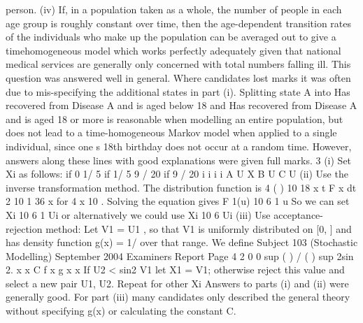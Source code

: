 \documentclass[a4paper,12pt]{article}
\begin{document}
person.
(iv) If, in a population taken as a whole, the number of people in each age group is
roughly constant over time, then the age-dependent transition rates of the
individuals who make up the population can be averaged out to give a timehomogeneous
model which works perfectly adequately given that national
medical services are generally only concerned with total numbers falling ill.
This question was answered well in general. Where candidates lost marks it
was often due to mis-specifying the additional states in part (i). Splitting state
A into Has recovered from Disease A and is aged below 18 and Has
recovered from Disease A and is aged 18 or more is reasonable when
modelling an entire population, but does not lead to a time-homogeneous
Markov model when applied to a single individual, since one s 18th birthday
does not occur at a random time. However, answers along these lines with
good explanations were given full marks.
3 (i) Set Xi as follows:
if 0 1/ 5
if 1/ 5 9 / 20
if 9 / 20
i
i i
i
A U
X B U
C U
(ii) Use the inverse transformation method.
The distribution function is
4
( ) 10
18
x t F x dt
2 10
1
36
x
for 4 x 10 .
Solving the equation gives F 1(u) 10 6 1 u
So we can set Xi 10 6 1 Ui
or alternatively we could use Xi 10 6 Ui
(iii) Use acceptance-rejection method:
Let V1 = U1 , so that V1 is uniformly distributed on [0, ] and has density
function g(x) = 1/ over that range.
We define
Subject 103 (Stochastic Modelling) September 2004 Examiners Report
Page 4
2
0 0
sup ( ) / ( ) sup 2sin 2.
x x
C f x g x x
If U2 < sin2 V1 let X1 = V1; otherwise reject this value and select a new pair
U1, U2. Repeat for other Xi
Answers to parts (i) and (ii) were generally good. For part (iii) many candidates only described the general theory without specifying g(x) or calculating the constant C.
\end{document}
